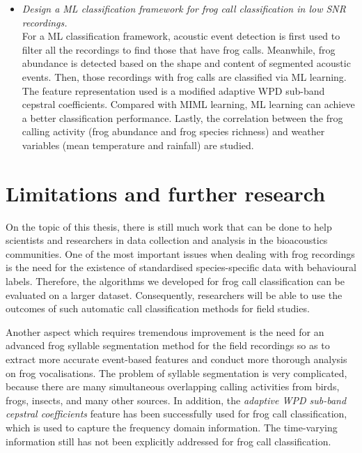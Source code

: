 \begin{itemize}
\item  \textit{Design a ML classification framework for frog call classification in low SNR recordings.} 
\\
For a ML classification framework, acoustic event detection is first used to filter all the recordings to find those that have frog calls. Meanwhile, frog abundance is detected based on the shape and content of segmented acoustic events. Then, those recordings with frog calls are classified via ML learning. The feature representation used is a modified adaptive WPD sub-band cepstral coefficients. Compared with MIML learning, ML learning can achieve a better classification performance. Lastly, the correlation between the frog calling activity (frog abundance and frog species richness) and weather variables (mean temperature and rainfall) are studied.

\end{itemize}

%
%


\section{Limitations and further research}	
On the topic of this thesis, there is still much work that can be done to help scientists and researchers in data collection and analysis in the bioacoustics communities. One of the most important issues when dealing with frog recordings is the need for the existence of standardised species-specific data with behavioural labels. 
Therefore, the algorithms we developed for frog call classification can be evaluated on a larger dataset. 
Consequently, researchers will be able to use the outcomes of such automatic call classification methods for field studies.

Another aspect which requires tremendous improvement is the need for an advanced frog syllable segmentation method for the field recordings so as to extract more accurate event-based features and conduct more thorough analysis on frog vocalisations. The problem of syllable segmentation is very complicated, because there are many simultaneous overlapping calling activities from birds, frogs, insects, and many other sources. In addition, the \textit{adaptive WPD sub-band cepstral coefficients} feature has been successfully used for frog call classification, which is used to capture the frequency domain information. The time-varying information still has not been explicitly addressed for frog call classification. 

